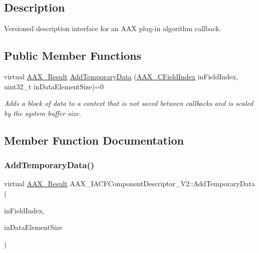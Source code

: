 \subsection{Description}
Versioned description interface for an A\+AX plug-\/in algorithm callback. \subsection*{Public Member Functions}
\begin{DoxyCompactItemize}
\item 
virtual \mbox{\hyperlink{a00392_a4d8f69a697df7f70c3a8e9b8ee130d2f}{A\+A\+X\+\_\+\+Result}} \mbox{\hyperlink{a01629_acbd4eb771c30fad8cf7a821941a7490e}{Add\+Temporary\+Data}} (\mbox{\hyperlink{a00392_ae807f8986143820cfb5d6da32165c9c7}{A\+A\+X\+\_\+\+C\+Field\+Index}} in\+Field\+Index, uint32\+\_\+t in\+Data\+Element\+Size)=0
\begin{DoxyCompactList}\small\item\em Adds a block of data to a context that is not saved between callbacks and is scaled by the system buffer size. \end{DoxyCompactList}\end{DoxyCompactItemize}


\subsection{Member Function Documentation}
\mbox{\label{a01629_acbd4eb771c30fad8cf7a821941a7490e}} 
\subsubsection{\texorpdfstring{AddTemporaryData()}{AddTemporaryData()}}
{\footnotesize\ttfamily virtual \mbox{\hyperlink{a00392_a4d8f69a697df7f70c3a8e9b8ee130d2f}{A\+A\+X\+\_\+\+Result}} A\+A\+X\+\_\+\+I\+A\+C\+F\+Component\+Descriptor\+\_\+\+V2\+::\+Add\+Temporary\+Data (\begin{DoxyParamCaption}\item[{\mbox{\hyperlink{a00392_ae807f8986143820cfb5d6da32165c9c7}{A\+A\+X\+\_\+\+C\+Field\+Index}}}]{in\+Field\+Index,  }\item[{uint32\+\_\+t}]{in\+Data\+Element\+Size }\end{DoxyParamCaption})\hspace{0.3cm}{\ttfamily [pure virtual]}}




